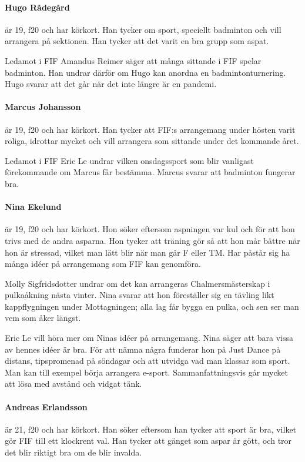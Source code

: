 \documentclass[hidelinks]{sektionsmote}
\begin{document}
\paragraph{Hugo Rådegård} är 19, f20 och har körkort.
Han tycker om sport, speciellt badminton och vill arrangera på sektionen.
Han tycker att det varit en bra grupp som aspat.

Ledamot i FIF Amandus Reimer säger att många sittande i FIF spelar badminton.
Han undrar därför om Hugo kan anordna en badmintonturnering.
Hugo svarar att det går när det inte längre är en pandemi.

\paragraph{Marcus Johansson} är 19, f20 och har körkort.
Han tycker att FIF:s arrangemang under hösten varit roliga, idrottar mycket och vill arrangera som sittande under det kommande året.

Ledamot i FIF Eric Le undrar vilken onsdagssport som blir vanligast förekommande om Marcus får bestämma.
Marcus svarar att badminton fungerar bra.

\paragraph{Nina Ekelund} är 19, f20 och har körkort.
Hon söker eftersom aspningen var kul och för att hon trivs med de andra asparna.
Hon tycker att träning gör så att hon mår bättre när hon är stressad, vilket man lätt blir när man går F eller TM.
Har påstår sig ha många idéer på arrangemang som FIF kan genomföra.

Molly Sigfridsdotter undrar om det kan arrangeras Chalmersmästerskap i pulkaåkning nästa vinter.
Nina svarar att hon föreställer sig en tävling likt kappflygningen under Mottagningen; alla lag får bygga en pulka, och sen ser man vem som åker längst.

Eric Le vill höra mer om Ninas idéer på arrangemang.
Nina säger att bara vissa av hennes idéer är bra.
För att nämna några funderar hon på Just Dance på distans, tipspromenad på söndagar och att utvidga vad man klassar som sport.
Man kan till exempel börja arrangera e-sport.
Sammanfattningsvis går mycket att lösa med avstånd och vidgat tänk.

\paragraph{Andreas Erlandsson} är 21, f20 och har körkort.
Han söker eftersom han tycker att sport är bra, vilket gör FIF till ett klockrent val.
Han tycker att gänget som aspar är gött, och tror det blir riktigt bra om de blir invalda.
\end{document}
